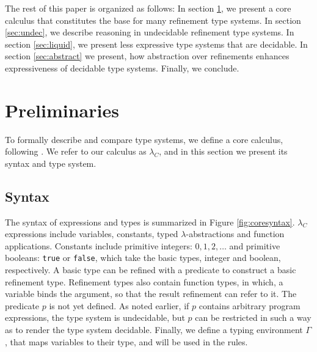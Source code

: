 The rest of this paper is organized as follows:
In section \ref{subsec:formal}, we present a core calculus
that constitutes the base for many refinement type systems.
In section \ref{sec:undec},
we describe reasoning in undecidable refinement type systems.
In section \ref{sec:liquid}, 
we present less expressive type systems
that are decidable.
In section \ref{sec:abstract} 
we present, how abstraction over refinements
enhances expressiveness of decidable type systems. 
Finally, we conclude.

\section{Preliminaries}\label{subsec:formal}

To formally describe and compare type systems, 
we define a core calculus, following \cite{flanagan06, LiquidPLDI08, Greenberg12}.
We refer to our calculus as $\lambda_C$, 
and in this section we present its syntax and type system.

\subsection{Syntax}
The syntax of expressions and types is summarized in Figure \ref{fig:coresyntax}.
$\lambda_C$ expressions include variables, constants,
typed $\lambda$-abstractions
and function applications. 
%
Constants include primitive integers:
$0, 1, 2, \dots$ and primitive booleans: \texttt{true} or \texttt{false},
which take the basic types, integer and boolean, respectively.
%
A basic type can be refined with a predicate to construct a basic
refinement type.
Refinement types also contain function types, 
in which, 
a variable binds the argument,
so that the result refinement can refer to it.  
%
The predicate $p$ is
not yet defined. 
As noted earlier, if $p$ contains arbitrary program 
expressions, the type system is undecidable, but 
$p$ can be restricted in such a way as to render 
the type system decidable.
%
Finally, we define a typing environment $\Gamma$, that maps variables to their type,
and will be used in the rules.


